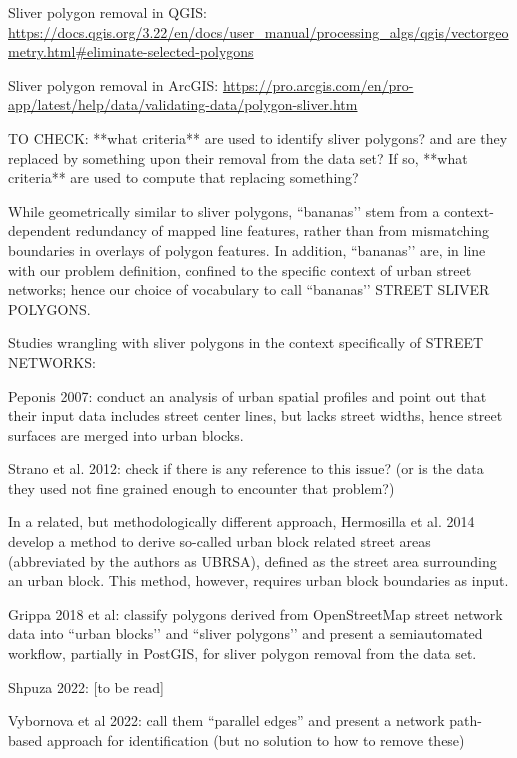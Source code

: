 Sliver polygon removal in QGIS: \url{https://docs.qgis.org/3.22/en/docs/user_manual/processing_algs/qgis/vectorgeometry.html#eliminate-selected-polygons}

Sliver polygon removal in ArcGIS: \url{https://pro.arcgis.com/en/pro-app/latest/help/data/validating-data/polygon-sliver.htm}

TO CHECK: **what criteria** are used to identify sliver polygons? and are they replaced by something upon their removal from the data set? If so, **what criteria** are used to compute that replacing something?

While geometrically similar to sliver polygons, ``bananas’’ stem from a context-dependent redundancy of mapped line features, rather than from mismatching boundaries in overlays of polygon features. In addition, ``bananas’’ are, in line with our problem definition, confined to the specific context of urban street networks; hence our choice of vocabulary to call ``bananas’’ STREET SLIVER POLYGONS.

Studies wrangling with sliver polygons in the context specifically of STREET NETWORKS:

Peponis 2007: conduct an analysis of urban spatial profiles and point out that their input data includes street center lines, but lacks street widths, hence street surfaces are merged into urban blocks. 

Strano et al. 2012: check if there is any reference to this issue? (or is the data they used not fine grained enough to encounter that problem?)

In a related, but methodologically different approach, Hermosilla et al. 2014 develop a method to derive so-called urban block related street areas (abbreviated by the authors as UBRSA), defined as the street area surrounding an urban block. This method, however, requires urban block boundaries as input.

Grippa 2018 et al: classify polygons derived from OpenStreetMap street network data into ``urban blocks’’ and ``sliver polygons’’ and present a semiautomated workflow, partially in PostGIS, for sliver polygon removal from the data set.

Shpuza 2022: [to be read]

Vybornova et al 2022: call them “parallel edges” and present a network path-based approach for identification (but no solution to how to remove these)



